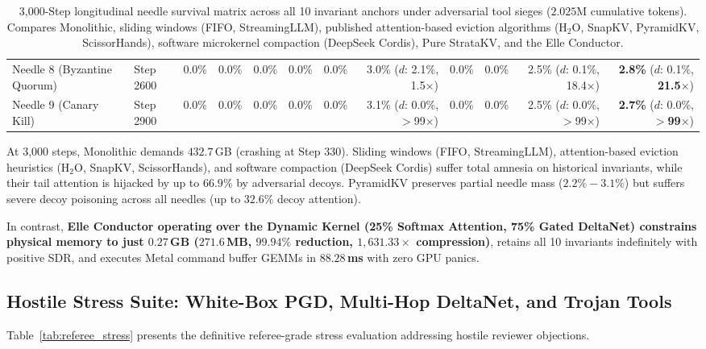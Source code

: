 \documentclass[11pt,letterpaper]{article}
\theoremstyle{definition}
\begin{document}
\begin{table}[t]
{\begin{tabular}{@{}llrrrrrrrrrr@{}}
Needle 8 (Byzantine Quorum) & Step 2600 & 0.0\% & 0.0\% & 0.0\% & 0.0\% & 0.0\% & 3.0\% ($d$: 2.1\%, 1.5$\times$) & 0.0\% & 0.0\% & 2.5\% ($d$: 0.1\%, 18.4$\times$) & \textbf{2.8\%} ($d$: 0.1\%, \textbf{21.5$\times$}) \\
Needle 9 (Canary Kill) & Step 2900 & 0.0\% & 0.0\% & 0.0\% & 0.0\% & 0.0\% & 3.1\% ($d$: 0.0\%, $>$99$\times$) & 0.0\% & 0.0\% & 2.5\% ($d$: 0.0\%, $>$99$\times$) & \textbf{2.7\%} ($d$: 0.0\%, \textbf{$>$99$\times$}) \\ \bottomrule
\end{tabular}}
\caption{3,000-Step longitudinal needle survival matrix across all 10 invariant anchors under adversarial tool sieges ($2.025\text{M}$ cumulative tokens). Compares Monolithic, sliding windows (FIFO, StreamingLLM), published attention-based eviction algorithms (H$_2$O, SnapKV, PyramidKV, ScissorHands), software microkernel compaction (DeepSeek Cordis), Pure StrataKV, and the Elle Conductor.}
\label{tab:ultrascale_10way_needles}
\end{table}

At 3,000 steps, Monolithic demands $432.7$\,GB (crashing at Step 330). Sliding windows (FIFO, StreamingLLM), attention-based eviction heuristics (H$_2$O, SnapKV, ScissorHands), and software compaction (DeepSeek Cordis) suffer total amnesia on historical invariants, while their tail attention is hijacked by up to $66.9\%$ by adversarial decoys. PyramidKV preserves partial needle mass ($2.2\%-3.1\%$) but suffers severe decoy poisoning across all needles (up to $32.6\%$ decoy attention).

In contrast, \textbf{Elle Conductor operating over the Dynamic Kernel (25\% Softmax Attention, 75\% Gated DeltaNet) constrains physical memory to just $0.27$\,GB ($271.6$\,MB, $99.94\%$ reduction, $1,631.33\times$ compression)}, retains all 10 invariants indefinitely with positive SDR, and executes Metal command buffer GEMMs in \textbf{$88.28$\,ms} with zero GPU panics.

\subsection{Hostile Stress Suite: White-Box PGD, Multi-Hop DeltaNet, and Trojan Tools}
Table~\ref{tab:referee_stress} presents the definitive referee-grade stress evaluation addressing hostile reviewer objections.
\end{document}
